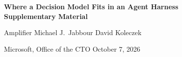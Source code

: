 \documentclass[11pt,letterpaper]{article}
\begin{document}
\thispagestyle{plain}
\begin{center}
  {\Large\sffamily\bfseries Where a Decision Model Fits in an Agent Harness\\[3pt]
   \large Supplementary Material\par}
  \vspace{8pt}
  {\normalsize Amplifier \qquad Michael J.\ Jabbour \qquad David Koleczek\par}
  \vspace{2pt}
  {\normalsize Microsoft, Office of the CTO \textperiodcentered{} October 7, 2026\par}
\end{center}
\vspace{6pt}
{\small\setcounter{tocdepth}{2}\tableofcontents}
\clearpage
{\small\listoffigures}
\clearpage
{\small\listoftables}
\clearpage









\end{document}
